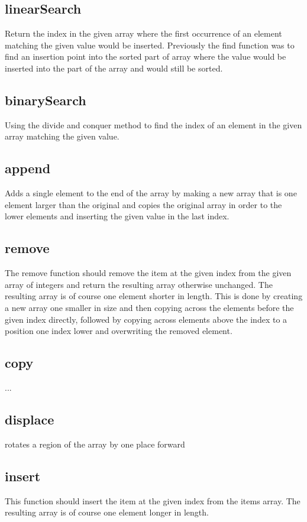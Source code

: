 \documentclass[10pt]{article} %
\begin{document}
\subsection{linearSearch}
Return the index in the given array where the first occurrence of an element matching the given value would be inserted. Previously the find function was to find an insertion point into the sorted part of array where the value would be inserted into the part of the array and would still be sorted.

\subsection{binarySearch}
Using the divide and conquer method to find the index of an element in the given array matching the given value.

\subsection{append}
Adds a single element to the end of the array by making a new array that is one element larger than the original and copies the original array in order to the lower elements and inserting the given value in the last index.

\subsection{remove}
The remove function should remove the item at the given index from the given array of integers and return the resulting array otherwise unchanged. The resulting array is of course one element shorter in length. This is done by creating a new array one smaller in size and then copying across the elements before the given index directly, followed by copying across elements above the index to a position one index lower and overwriting the removed element.

\subsection{copy}
...

\subsection{displace}
rotates a region of the array by one place forward

\subsection{insert}
This function should insert the item at the given index from the items array.  The resulting array is of course one element longer in length.

\end{document}
